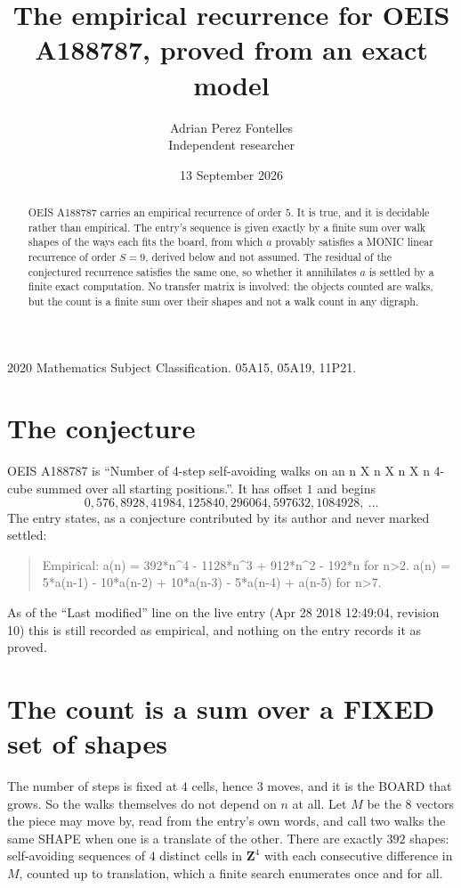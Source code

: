 \documentclass[11pt,a4paper]{article}
\title{The empirical recurrence for OEIS A188787, proved from an exact model}
\author{Adrian Perez Fontelles\\ \small Independent researcher}
\date{13 September 2026}
\theoremstyle{plain}
\theoremstyle{definition}
\begin{document}
\maketitle

\begin{abstract}
OEIS A188787 carries an empirical recurrence of order $5$. It is true, and it is
decidable rather than empirical. The entry's sequence is given exactly by a finite sum over walk shapes of the ways each fits the board, from
which $a$ provably satisfies a MONIC linear recurrence of order $S=9$, derived below and not
assumed. The residual of the conjectured recurrence satisfies the same one, so whether it
annihilates $a$ is settled by a finite exact computation. No transfer matrix is involved: the objects counted are walks, but the count is a finite sum over their shapes and not a walk count in any digraph.
\end{abstract}

\noindent\small 2020 Mathematics Subject Classification. 05A15, 05A19, 11P21.\normalsize

\section{The conjecture}

OEIS A188787 is ``Number of 4-step self-avoiding walks on an n X n X n X n 4-cube summed over all starting positions.''. It has offset $1$ and begins
\[
0, 576, 8928, 41984, 125840, 296064, 597632, 1084928,\ \dots
\]
The entry states, as a conjecture contributed by its author and never marked settled:
\begin{quote}
Empirical: a(n) = 392*n\^{}4 - 1128*n\^{}3 + 912*n\^{}2 - 192*n for n>2. a(n) = 5*a(n-1) - 10*a(n-2) + 10*a(n-3) - 5*a(n-4) + a(n-5) for n>7.
\end{quote}
As of the ``Last modified'' line on the live entry (Apr 28 2018 12:49:04, revision 10)
this is still recorded as empirical, and nothing on the entry records it as proved.

\section{The count is a sum over a FIXED set of shapes}

The number of steps is fixed at $4$ cells, hence $3$ moves, and it is the BOARD
that grows. So the walks themselves do not depend on $n$ at all. Let $M$ be the $8$
vectors the piece may move by, read from the entry's own words, and call two walks the same
SHAPE when one is a translate of the other. There are exactly $392$ shapes: self-avoiding
sequences of $4$ distinct cells in $\mathbf{Z}^{4}$ with each consecutive difference in
$M$, counted up to translation, which a finite search enumerates once and for all.
\end{document}
